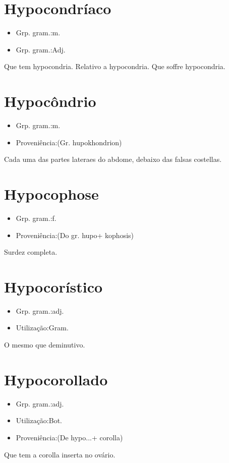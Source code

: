 \documentclass{article}
\begin{document}
\section{Hypocondríaco}
\begin{itemize}
\item {Grp. gram.:m.}
\end{itemize}
\begin{itemize}
\item {Grp. gram.:Adj.}
\end{itemize}
Que tem hypocondria.
Relativo a hypocondria.
Que soffre hypocondria.
\section{Hypocôndrio}
\begin{itemize}
\item {Grp. gram.:m.}
\end{itemize}
\begin{itemize}
\item {Proveniência:(Gr. \textunderscore hupokhondrion\textunderscore )}
\end{itemize}
Cada uma das partes lateraes do abdome, debaixo das falsas costellas.
\section{Hypocophose}
\begin{itemize}
\item {Grp. gram.:f.}
\end{itemize}
\begin{itemize}
\item {Proveniência:(Do gr. \textunderscore hupo\textunderscore  + \textunderscore kophosis\textunderscore )}
\end{itemize}
Surdez completa.
\section{Hypocorístico}
\begin{itemize}
\item {Grp. gram.:adj.}
\end{itemize}
\begin{itemize}
\item {Utilização:Gram.}
\end{itemize}
O mesmo que \textunderscore deminutivo\textunderscore .
\section{Hypocorollado}
\begin{itemize}
\item {Grp. gram.:adj.}
\end{itemize}
\begin{itemize}
\item {Utilização:Bot.}
\end{itemize}
\begin{itemize}
\item {Proveniência:(De \textunderscore hypo...\textunderscore  + \textunderscore corolla\textunderscore )}
\end{itemize}
Que tem a corolla inserta no ovário.
\end{document}
